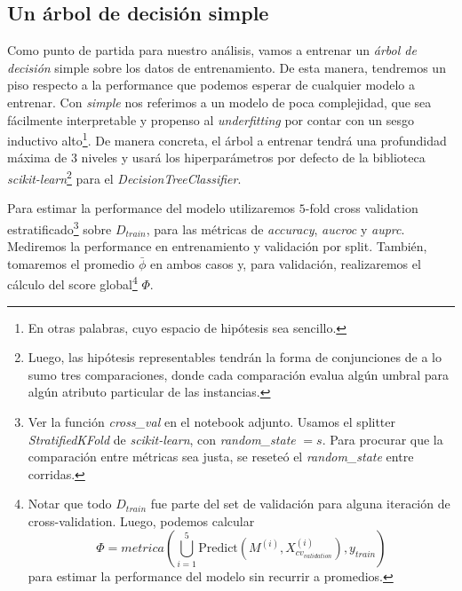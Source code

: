 \subsection{Un árbol de decisión simple}\label{simple}

Como punto de partida para nuestro análisis, vamos a entrenar un \textit{árbol de decisión} simple sobre los datos de entrenamiento. De esta manera, tendremos un piso respecto a la performance que podemos esperar de cualquier modelo a entrenar. Con \textit{simple} nos referimos a un modelo de poca complejidad, que sea fácilmente interpretable y propenso al \textit{underfitting} por contar con un sesgo inductivo alto\footnote{En otras palabras, cuyo espacio de hipótesis sea sencillo.}. De manera concreta, el árbol a entrenar tendrá una profundidad máxima de $3$ niveles y usará los hiperparámetros por defecto de la biblioteca \textit{scikit-learn}\footnote{Luego, las hipótesis representables tendrán la forma de conjunciones de a lo sumo tres comparaciones, donde cada comparación evalua algún umbral para algún atributo particular de las instancias.} para el \textit{DecisionTreeClassifier}.

Para estimar la performance del modelo utilizaremos $5$-fold cross validation estratificado\footnote{Ver la función \textit{cross\_val} en el notebook adjunto. Usamos el splitter \textit{StratifiedKFold} de \textit{scikit-learn}, con \textit{random\_state} $= s$. Para procurar que la comparación entre métricas sea justa, se reseteó el \textit{random\_state} entre corridas.} sobre $D_{train}$, para las métricas de \textit{accuracy}, \textit{aucroc} y \textit{auprc}. Mediremos la performance en entrenamiento y validación por split. También, tomaremos el promedio $\bar\phi$ en ambos casos y, para validación, realizaremos el cálculo del score global\footnote{Notar que todo $D_{train}$ fue parte del set de validación para alguna iteración de cross-validation. Luego, podemos calcular $$\Phi = metrica(\bigcup_{i=1}^5\text{Predict}(M^{(i)}, X_{cv_{validation}}^{(i)}), y_{train})$$ para estimar la performance del modelo sin recurrir a promedios.} $\Phi$.

